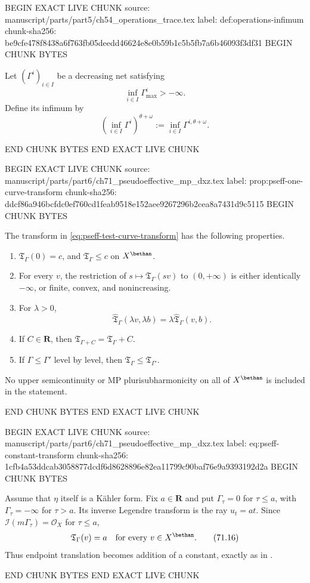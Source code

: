 BEGIN EXACT LIVE CHUNK
source: manuscript/parts/part5/ch54_operations_trace.tex
label: def:operations-infimum
chunk-sha256: be9cfe478f8438a6f763fb05deedd46624e8e0b59b1c5b5fb7a6b46093f3df31
BEGIN CHUNK BYTES
\begin{definition}
\label{def:operations-infimum}
Let \((\Gamma^i)_{i\in I}\) be a decreasing net satisfying
\[
                   \inf_{i\in I}\Gamma^i_{\max}>-\infty.
\tag{54.10}\label{eq:operations-inf-bound}
\]
Define its infimum by
\[
 \left(\inf_{i\in I}\Gamma^i\right)^{\theta+\omega}
 :=\inf_{i\in I}\Gamma^{i,\theta+\omega}.
\tag{54.11}\label{eq:operations-infimum}
\]
\end{definition}
END CHUNK BYTES
END EXACT LIVE CHUNK

BEGIN EXACT LIVE CHUNK
source: manuscript/parts/part6/ch71_pseudoeffective_mp_dxz.tex
label: prop:pseff-one-curve-transform
chunk-sha256: ddcf86a946bcfdc0ef760cd1feab9518e152aee9267296b2cea8a7431d9c5115
BEGIN CHUNK BYTES
\begin{proposition}\label{prop:pseff-one-curve-transform}
The transform in \eqref{eq:pseff-test-curve-transform} has the following
properties.
\begin{enumerate}
\item \(\mathfrak T_\Gamma(0)=c\), and
      \(\mathfrak T_\Gamma\leq c\) on \(X^{\bethan}\).
\item For every \(v\), the restriction of
      \(s\mapsto\mathfrak T_\Gamma(sv)\) to \((0,+\infty)\) is either
      identically \(-\infty\), or finite, convex, and nonincreasing.
\item For \(\lambda>0\),
      \[
       \widehat{\mathfrak T}_\Gamma(\lambda v,\lambda b)
       =\lambda\widehat{\mathfrak T}_\Gamma(v,b).
      \tag{71.14}\label{eq:pseff-joint-homogeneity}
      \]
\item If \(C\in\mathbf R\), then
      \(\mathfrak T_{\Gamma+C}=\mathfrak T_\Gamma+C\).
\item If \(\Gamma\leq\Gamma'\) level by level, then
      \(\mathfrak T_\Gamma\leq\mathfrak T_{\Gamma'}\).
\end{enumerate}
No upper semicontinuity or MP plurisubharmonicity on all of
\(X^{\bethan}\) is included in the statement.
\end{proposition}
END CHUNK BYTES
END EXACT LIVE CHUNK

BEGIN EXACT LIVE CHUNK
source: manuscript/parts/part6/ch71_pseudoeffective_mp_dxz.tex
label: eq:pseff-constant-transform
chunk-sha256: 1cfb4a53ddcab3058877dcdf6d8628896e82ea11799c90baf76e9a9393192d2a
BEGIN CHUNK BYTES
\begin{example}
Assume that \(\eta\) itself is a K\"ahler form.  Fix \(a\in\mathbf R\) and
put \(\Gamma_\tau=0\) for \(\tau\leq a\), with
\(\Gamma_\tau=-\infty\) for \(\tau>a\).  Its inverse Legendre transform is
the ray \(u_t=at\).  Since
\(\mathcal I(m\Gamma_\tau)=\mathcal O_X\) for \(\tau\leq a\),
\[
                         \mathfrak T_\Gamma(v)=a
                         \quad\text{for every }v\in X^{\bethan}.
\tag{71.16}\label{eq:pseff-constant-transform}
\]
Thus endpoint translation becomes addition of a constant, exactly as in
.
\end{example}
END CHUNK BYTES
END EXACT LIVE CHUNK

